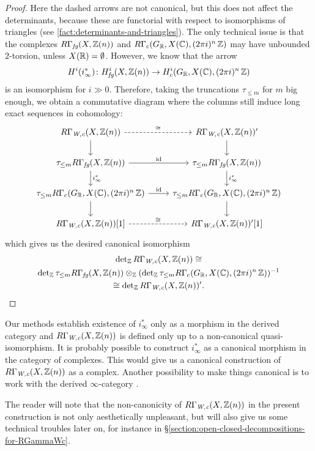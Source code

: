 \begin{proposition}
\begin{proof}
    Here the dashed arrows are not canonical, but this does not affect the
    determinants, because these are functorial with respect to isomorphisms of
    triangles (see \ref{fact:determinants-and-triangles}). The only technical
    issue is that the complexes $R\Gamma_\text{\it fg} (X,\mathbb{Z} (n))$ and
    $R\Gamma_c (G_{\mathbb{R}}, X (\mathbb{C}), (2\pi i)^n\,\mathbb{Z})$ may have unbounded
    $2$-torsion, unless $X (\mathbb{R}) = \emptyset$. However, we know that the arrow
    \[ H^i (i_\infty^*)\colon H^i_\text{\it fg} (X,\mathbb{Z} (n)) \to
      H^i_c (G_{\mathbb{R}}, X (\mathbb{C}), (2\pi i)^n\,\mathbb{Z}) \]
    is an isomorphism for $i \gg 0$. Therefore, taking the truncations
    $\tau_{\le m}$ for $m$ big enough, we obtain a commutative diagram where the
    columns still induce long exact sequences in cohomology:
    \[ \begin{tikzcd}
        R\Gamma_\text{\it W,c} (X,\ZZ (n)) \ar{d}\ar[dashed]{r}{\isom} & R\Gamma_\text{\it W,c} (X,\ZZ (n))' \ar{d} \\
        \tau_{\le m} R\Gamma_\text{\it fg} (X,\ZZ (n)) \ar{d}{i_\infty^*}\ar{r}{\idid} & \tau_{\le m} R\Gamma_\text{\it fg} (X,\ZZ (n)) \ar{d}{i_\infty^*} \\
        \tau_{\le m} R\Gamma_c (G_\RR, X (\CC), (2\pi i)^n\,\ZZ) \ar{d}\ar{r}{\idid} & \tau_{\le m} R\Gamma_c (G_\RR, X (\CC), (2\pi i)^n\,\ZZ) \ar{d} \\
        R\Gamma_\text{\it W,c} (X,\ZZ (n)) [1]\ar[dashed]{r}{\isom} & R\Gamma_\text{\it W,c} (X,\ZZ (n))' [1]
      \end{tikzcd} \]
    which gives us the desired canonical isomorphism
    \begin{multline*}
      \det\nolimits_{\mathbb{Z}} R\Gamma_\text{\it W,c} (X,\mathbb{Z} (n)) \cong\\
      \det\nolimits_{\mathbb{Z}} \tau_{\le m} R\Gamma_\text{\it fg} (X,\mathbb{Z} (n))
      \otimes_{\mathbb{Z}}
      (\det\nolimits_{\mathbb{Z}} \tau_{\le m} R\Gamma_c (G_{\mathbb{R}}, X (\mathbb{C}), (2\pi i)^n\,\mathbb{Z}))^{-1} \\
      \cong \det\nolimits_{\mathbb{Z}} R\Gamma_\text{\it W,c} (X,\mathbb{Z} (n))'.
    \end{multline*}
  \end{proof}
\end{proposition}

\begin{remark}
  Our methods establish existence of $i_\infty^*$ only as a morphism in the
  derived category and $R\Gamma_\text{\it W,c} (X,\mathbb{Z}(n))$ is defined only up to
  a non-canonical quasi-isomorphism. It is probably possible to construct
  $i_\infty^*$ as a canonical morphism in the category of complexes. This would
  give us a canonical construction of $R\Gamma_\text{\it W,c} (X,\mathbb{Z}(n))$ as a
  complex. Another possibility to make things canonical is to work with the
  derived $\infty$-category \cite{Lurie-DAG-1}.

  The reader will note that the non-canonicity of
  $R\Gamma_\text{\it W,c} (X,\mathbb{Z}(n))$ in the present construction is not only
  aesthetically unpleasant, but will also give us some technical troubles later
  on, for instance in \S\ref{section:open-closed-decompositions-for-RGammaWc}.
\end{remark}

